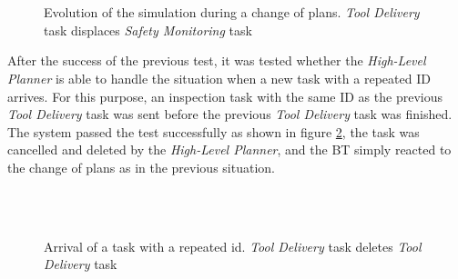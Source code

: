 \begin{figure}[htbp]
    \centering
    \hfill
    \\
    \hfill
    \\
        \hfill
    \caption{Evolution of the simulation during a change of plans. \emph{Tool Delivery} task displaces \emph{Safety Monitoring} task}
    \label{fig:event_ChangeOfPlans}
\end{figure}

After the success of the previous test, it was tested whether the \emph{High-Level Planner} is able to handle the situation when a new task with a repeated \gls{ID} arrives. For this purpose, an inspection task with the same \gls{ID} as the previous \emph{Tool Delivery} task was sent before the previous \emph{Tool Delivery} task was finished. The system passed the test successfully as shown in figure \ref{fig:event_DuplicatedID}, the task was cancelled and deleted by the \emph{High-Level Planner}, and the \gls{BT} simply reacted to the change of plans as in the previous situation.

\begin{figure}[htbp]
    \centering
    \hfill
    \\
    \hfill
    \\
        \hfill
    \caption{Arrival of a task with a repeated id. \emph{Tool Delivery} task deletes \emph{Tool Delivery} task}
    \label{fig:event_DuplicatedID}
\end{figure}

